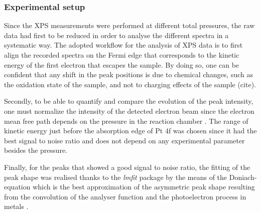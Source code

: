 \subsubsection{Experimental setup}

Since the XPS measurements were performed at different total pressures, the raw data had first to be reduced in order to analyse the different spectra in a systematic way.
The adopted workflow for the analysis of XPS data is to first align the recorded spectra on the Fermi edge that corresponds to the kinetic energy of the first electron that escapes the sample.
By doing so, one can be confident that any shift in the peak positions is due to chemical changes, such as the oxidation state of the sample, and not to charging effects of the sample (cite).

Secondly, to be able to quantify and compare the evolution of the peak intensity, one must normalize the intensity of the detected electron beam since the electron mean free path depends on the pressure in the reaction chamber \parencite{Willmott}.
The range of kinetic energy just before the absorption edge of Pt 4f was chosen since it had the best signal to noise ratio and does not depend on any experimental parameter besides the pressure.

Finally, for the peaks that showed a good signal to noise ratio, the fitting of the peak shape was realised thanks to the \textit{lmfit} \parencite{Newville2016} package by the means of the Doniach-equation which is the best approximation of the asymmetric peak shape resulting from the convolution of the analyser function and the photoelectron process in metals \parencite{Doniach_1970}.
